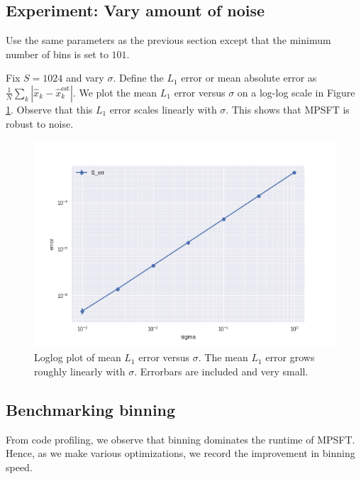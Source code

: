 \documentclass[10pt]{article}
\begin{document}
\subsection{Experiment: Vary amount of noise}

Use the same parameters as the previous section except that the minimum number of bins is set to $101$.

Fix $S=1024$ and vary $\sigma$. Define the $L_1$ error or mean absolute error as $\frac{1}{N}\sum_k |\hat{x}_k - \hat{x}^{\text{est}}_k|$. We plot the mean $L_1$ error versus $\sigma$ on a log-log scale in Figure \ref{fig:noise}. Observe that this $L_1$ error scales linearly with $\sigma$. This shows that MPSFT is robust to noise.

\begin{figure}
\centering
\includegraphics[scale=0.6]{./graph/noise}
\caption{Loglog plot of mean $L_1$ error versus $\sigma$. The mean $L_1$ error grows roughly linearly with $\sigma$. Errorbars are included and very small. \label{fig:noise}}
\end{figure}

\subsection{Benchmarking binning}
From code profiling, we observe that binning dominates the runtime of MPSFT. Hence, as we make various optimizations, we record the improvement in binning speed.
\end{document}
